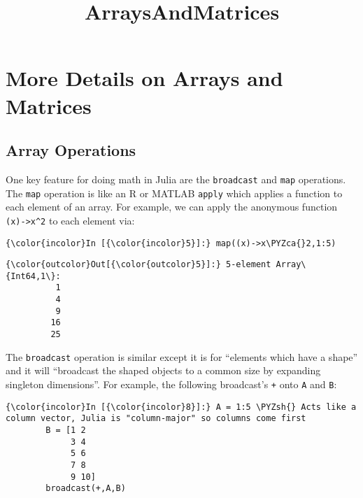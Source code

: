 \documentclass[11pt]{article}
\title{ArraysAndMatrices}
\def\PYZca{\char`\^}
\def\PYZsh{\char`\#}
\begin{document}
    
    
    \maketitle
    
    

    
    \section{More Details on Arrays and
Matrices}\label{more-details-on-arrays-and-matrices}

    \subsection{Array Operations}\label{array-operations}

    One key feature for doing math in Julia are the \texttt{broadcast} and
\texttt{map} operations. The \texttt{map} operation is like an R or
MATLAB \texttt{apply} which applies a function to each element of an
array. For example, we can apply the anonymous function
\texttt{(x)-\textgreater{}x\^{}2} to each element via:

    \begin{Verbatim}[commandchars=\\\{\}]
{\color{incolor}In [{\color{incolor}5}]:} map((x)->x\PYZca{}2,1:5)
\end{Verbatim}

            \begin{Verbatim}[commandchars=\\\{\}]
{\color{outcolor}Out[{\color{outcolor}5}]:} 5-element Array\{Int64,1\}:
          1
          4
          9
         16
         25
\end{Verbatim}
        
    The \texttt{broadcast} operation is similar except it is for ``elements
which have a shape'' and it will ``broadcast the shaped objects to a
common size by expanding singleton dimensions''. For example, the
following broadcast's \texttt{+} onto \texttt{A} and \texttt{B}:

    \begin{Verbatim}[commandchars=\\\{\}]
{\color{incolor}In [{\color{incolor}8}]:} A = 1:5 \PYZsh{} Acts like a column vector, Julia is "column-major" so columns come first
        B = [1 2
             3 4
             5 6
             7 8
             9 10]
        broadcast(+,A,B)
\end{Verbatim}
\end{document}
